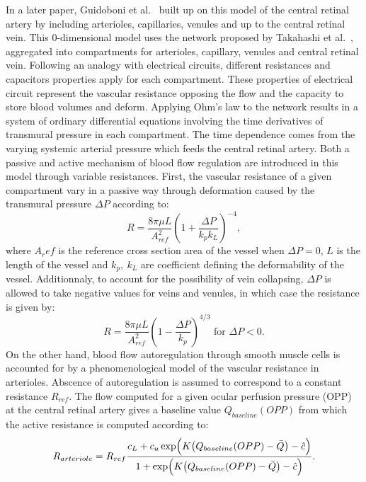 \documentclass[12pt,a4paper]{article}
\begin{document}
In a later paper, Guidoboni et al.~\cite{Guidoboni_2014b} built up on this model of the central retinal artery by including arterioles, capillaries, venules and up to the central retinal vein.
This 0-dimensional model uses the network proposed by Takahashi et al.~\cite{Takahashi_2009}, aggregated into compartments for arterioles, capillary, venules and central retinal vein.
Following an analogy with electrical circuits, different resistances and capacitors properties apply for each compartment.
These properties of electrical circuit represent the vascular resistance opposing the flow and the capacity to store blood volumes and deform.
Applying Ohm's law to the network results in a system of ordinary differential equations involving the time derivatives of transmural pressure in each compartment.
The time dependence comes from the varying systemic arterial pressure which feeds the central retinal artery.
Both a passive and active mechanism of blood flow regulation are introduced in this model through variable resistances.
First, the vascular resistance of a given compartment vary in a passive way through deformation caused by the transmural pressure $\Delta P$ according to:
\begin{equation}
  \label{eq:PassiveVariableResistance}
  R = \frac{8\pi\mu L}{A^2_{ref}}\left(1+\frac{\Delta P}{k_pk_L}\right)^{-4},
\end{equation}
where $A_ref$ is the reference cross section area of the vessel when $\Delta P = 0$, $L$ is the length of the vessel and $k_p,~k_L$ are coefficient defining the deformability of the vessel.
Additionnaly, to account for the possibility of vein collapsing, $\Delta P$ is allowed to take negative values for veins and venules, in which case the resistance is given by:
\begin{equation}
  \label{eq:PassiveVariableResistanceCollapse}
  R = \frac{8\pi\mu L}{A^2_{ref}}\left(1-\frac{\Delta P}{k_p}\right)^{4/3} \text{ for } \Delta P<0.
\end{equation}
On the other hand, blood flow autoregulation through smooth muscle cells is accounted for by a phenomenological model of the vascular resistance in arterioles.
Abscence of autoregulation is assumed to correspond to a constant resistance $R_{ref}$.
The flow computed for a given ocular perfusion pressure (OPP) at the central retinal artery gives a baseline value $Q_{baseline}(OPP)$ from which the active resistance is computed according to:
\begin{equation}
  \label{eq:ActiveResistancePhenomenological}
  R_{arteriole} = R_{ref}\frac{c_L + c_u\exp\Bigl(K\bigl(Q_{baseline}(OPP)-\bar Q\bigr)-\hat c\Bigr)}{1 + \exp\Bigl(K\bigl(Q_{baseline}(OPP)-\bar Q\bigr)-\hat c\Bigr)}.
\end{equation}
\end{document}
